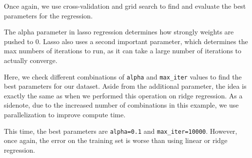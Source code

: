 \documentclass[11pt]{article}
\begin{document}
Once again, we use cross-validation and grid search to find and evaluate
the best parameters for the regression.

The alpha parameter in lasso regression determines how strongly weights
are pushed to 0. Lasso also uses a second important parameter, which
determines the max numbers of iterations to run, as it can take a large
number of iterations to actually converge.

Here, we check different combinations of \texttt{alpha} and
\texttt{max\_iter} values to find the best parameters for our dataset.
Aside from the additional parameter, the idea is exactly the same as
when we performed this operation on ridge regression. As a sidenote, due
to the increased number of combinations in this example, we use
parallelization to improve compute time.

This time, the best parameters are \texttt{alpha=0.1} and
\texttt{max\_iter=10000}. However, once again, the error on the training
set is worse than using linear or ridge regression.
\end{document}
